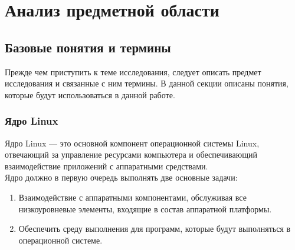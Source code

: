 \chapter{Анализ предметной области}

\section{Базовые понятия и термины}
Прежде чем приступить к теме исследования, следует описать предмет исследования и связанные с ним термины.
В данной секции описаны понятия, которые будут использоваться в данной работе.

\subsection{Ядро Linux}
Ядро Linux — это основной компонент операционной системы Linux, отвечающий за управление ресурсами компьютера и обеспечивающий взаимодействие приложений с аппаратными средствами.\\
Ядро должно в первую очередь выполнять две основные задачи:
\begin{enumerate}
    \item Взаимодействие с аппаратными компонентами, обслуживая все низкоуровневые элементы, входящие в состав аппаратной платформы.
    \item Обеспечить среду выполнения для программ, которые будут выполняться в операционной системе.
\end{enumerate}

